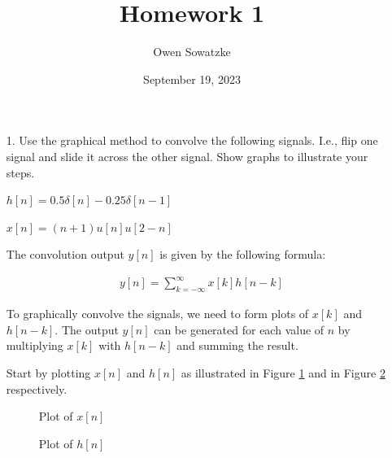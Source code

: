 \documentclass[fleqn]{article}
\title{Homework 1}
\author{Owen Sowatzke}
\date{September 19, 2023}
\begin{document}
	\setlength{\abovedisplayskip}{0pt}
	\setlength{\belowdisplayskip}{0pt}
	\setlength{\abovedisplayshortskip}{0pt}
	\setlength{\belowdisplayshortskip}{0pt}
	\setlength{\mathindent}{0pt}
	\doublespacing
	\maketitle
	
	\begin{enumerate}[nolistsep]
		\item[1.] Use the graphical method to convolve the following signals. I.e., flip one signal and slide it across the other signal. Show graphs to illustrate your steps.
		
		$h[n] = 0.5\delta[n] - 0.25\delta[n-1]$
		
		$x[n] = (n+1)u[n]u[2-n]$
		
		The convolution output $y[n]$ is given by the following formula:
		
		\begin{align*}
			y[n] = \sum_{k=-\infty}^{\infty}{x[k]h[n-k]}
		\end{align*}
		
		To graphically convolve the signals, we need to form plots of $x[k]$ and \newline $h[n-k]$. The output $y[n]$ can be generated for each value of $n$ by multiplying $x[k]$ with $h[n-k]$ and summing the result.
		
		Start by plotting $x[n]$ and $h[n]$ as illustrated in Figure \ref{prob1_xn_plot} and in Figure \ref{prob1_hn_plot} respectively.
		
		\begin{figure}[H]				
			\centerline{}
			\caption{Plot of $x[n]$}
			\label{prob1_xn_plot}
		\end{figure}
		
		\begin{figure}[H]				
			\centerline{}
			\caption{Plot of $h[n]$}
			\label{prob1_hn_plot}
		\end{figure}
		

\end{enumerate}
\end{document}
